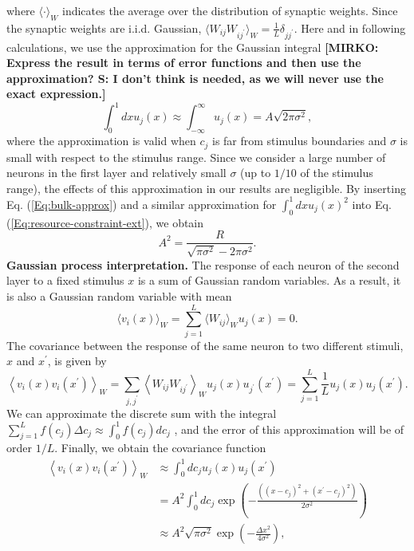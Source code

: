 \documentclass[a4paper]{article}%
\begin{document}
where $\langle\cdot\rangle_{W}$ indicates the average over the distribution of
synaptic weights. Since the synaptic weights are i.i.d.
Gaussian, $\langle W_{ij}W_{ij^{\prime}}\rangle_{W} = \frac{1}{L}%
\delta_{jj^{\prime}}$. Here and in following calculations, we use the
approximation for the Gaussian integral \textbf{[MIRKO: Express the result in terms of error functions and then use the approximation? S: I don't think is needed, as we will never use the exact expression.]}
\begin{equation}
\int_{0}^{1} dx u_{j}(x) \approx\int_{-\infty}^{\infty} u_{j}(x) = A
\sqrt{2\pi\sigma^{2}}, \label{Eq:bulk-approx}%
\end{equation}
where the approximation is valid when $c_{j}$ is far from stimulus boundaries and
$\sigma$ is small with respect to the stimulus range. Since we consider a large
number of neurons in the first layer and relatively small $\sigma$ (up to
$1/10$ of the stimulus range), the effects of this approximation in our
results are negligible. By inserting Eq. (\ref{Eq:bulk-approx}) and a similar
approximation for $\int_{0}^{1} dx u_{j}(x)^{2}$ into Eq.
(\ref{Eq:resource-constraint-ext}), we obtain 
\begin{equation}
A^{2} = \frac{R}{\sqrt{\pi\sigma^{2}} - 2\pi\sigma^{2}}.
\end{equation}
\newline\newline\textbf{Gaussian process interpretation.} The response of each
neuron of the second layer to a fixed stimulus $x$ is a sum of Gaussian random
variables. As a result, it is also a Gaussian random variable with mean
\begin{equation}
\langle v_{i}(x) \rangle_{W} = \sum_{j=1}^{L} \langle W_{ij}\rangle_{W}
u_{j}(x) = 0. \label{Eq:GP-mean}%
\end{equation}
The covariance between the response of the same neuron to two different
stimuli, $x$ and $x^{\prime}$, is given by
\begin{equation}
\left\langle v_{i}(x)v_{i}(x^{\prime}) \right\rangle _{W} = \sum_{j,j^{\prime
}} \left\langle W_{ij}W_{ij^{\prime}} \right\rangle _{W} u_{j}(x)
u_{j^{\prime}}(x^{\prime}) = \sum_{j=1}^{L} \frac{1}{L} u_{j}(x)
u_{j}(x^{\prime}).
\end{equation}
We can approximate the discrete sum with the integral $\sum_{j=1}^{L} f(c_{j})
\Delta c_{j} \approx\int_{0}^{1} f(c_{j}) dc_{j}$ , and the error of this
approximation will be of order $1/L$. Finally, we obtain the covariance function
\begin{equation}
\begin{split}
\left\langle v_{i}(x)v_{i}(x^{\prime}) \right\rangle _{W}  &  \approx\int
_{0}^{1} dc_{j} u_{j}(x)u_{j}(x^{\prime})\\
&  = A^{2} \int_{0}^{1} dc_{j} \exp\left(  -\frac{\left(  \left(
x-c_{j}\right)  ^{2} + \left(  x^{\prime}-c_{j}\right)  ^{2}\right)  }
{2\sigma^{2}}\right) \\
&  \approx A^{2} \sqrt{\pi\sigma^{2}}\exp\left(  -\frac{\Delta x^{2}}
{4\sigma^{2}}\right)  ,\label{Eq:GP-cov}
\end{split}
\end{equation}
\end{document}
